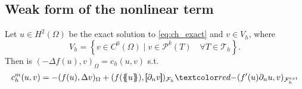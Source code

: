\subsection{Weak form of the nonlinear term}%
\label{sub:derivation_of_the_cahn_hilliard_cip_formulation}

\begin{lemma}
    Let $u \in H^2( \Omega ) $ be the exact solution to \ref{eq:ch_exact} and $v \in V_{h}$, where
\[
V_{h} = \left\{ v \in C^{0}( \Omega )   \mid v\in \mathcal{P} ^{k} ( T) \quad \forall T \in \mathcal{T} _{h} \right\}.
\]
Then is $( -\Delta f( u) , v)_{\Omega } = c_{h}(u,v )   $ s.t.
\[
    c^{m}_{h} ( u,v) = - ( f( u), \Delta v )_{ \Omega } + ( f( \mean{ u }  ), \jump{ \partial _{n} v }   )_{\mathcal{F}_{h} }  \red{- ( f' (  u  )  \partial _{n}u ,  v      )_{\mathcal{F}_{h} ^{ext}}}
\]

\end{lemma}

